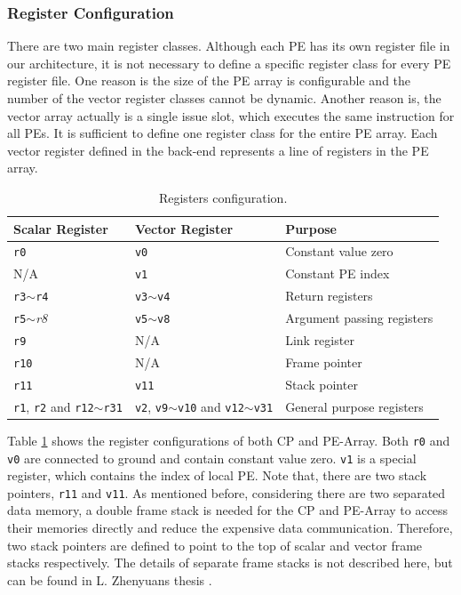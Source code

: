 \subsubsection{Register Configuration}
There are two main register classes. Although each PE has its own register file in our architecture, it is not necessary to define a specific register class for every PE register file. One reason is the size of the PE array is configurable and the number of the vector register classes cannot be dynamic. Another reason is, the vector array actually is a single issue slot, which executes the same instruction for all PEs. It is sufficient to define one register class for the entire PE array. Each vector register defined in the back-end represents a line of registers in the PE array.

\begin{table}[t]
\caption{Registers configuration.}
\begin{center}
\begin{tabular}{@{}l l l@{}}
\toprule
\textbf{Scalar Register} & \textbf{Vector Register} & \textbf{Purpose} \\ \hline
\texttt{r0} & \texttt{v0} & Constant value zero \\
N/A & \texttt{v1} & Constant PE index \\
\texttt{r3}$\sim$\texttt{r4}  & \texttt{v3}$\sim$\texttt{v4} & Return registers \\
\texttt{r5}$\sim$\emph{r8} & \texttt{v5}$\sim$\texttt{v8} & Argument passing registers \\
\texttt{r9} & N/A & Link register \\ 
\texttt{r10} & N/A & Frame pointer \\
\texttt{r11} & \texttt{v11} & Stack pointer \\
\texttt{r1}, \texttt{r2} and \texttt{r12}$\sim$\texttt{r31} & \texttt{v2}, \texttt{v9}$\sim$\texttt{v10} and \texttt{v12}$\sim$\texttt{v31} & General purpose registers \\
\bottomrule
\end{tabular}
\end{center}
\label{table:register_conf}
\end{table}%

Table \ref{table:register_conf} shows the register configurations of both CP and PE-Array.
Both \texttt{r0} and \texttt{v0} are connected to ground and contain constant value zero. \texttt{v1} is a special register, which contains the index of local PE. Note that, there are two stack pointers, \texttt{r11} and \texttt{v11}. As mentioned before, considering there are two separated data memory, a double frame stack is needed for the CP and PE-Array to access their memories directly and reduce the expensive data communication. Therefore, two stack pointers are defined to point to the top of scalar and vector frame stacks respectively. The details of separate frame stacks is not described here, but can be found in L. Zhenyuans thesis \cite[Chapter~4]{liu_zhenyuan}.

